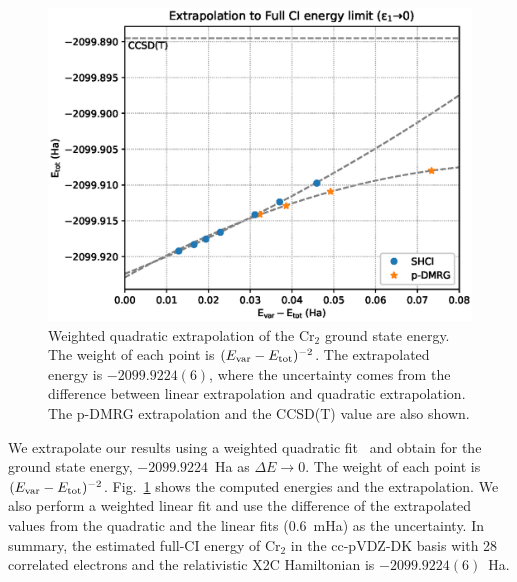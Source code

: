 \documentclass[%
reprint,
 superscriptaddress,
 amsmath,amssymb,
 aps,
]{revtex4-1}
\begin{document}
\begin{figure}
  \includegraphics[width=\linewidth]{extrapolation/extrapolate.eps}
  \caption{Weighted quadratic extrapolation of the Cr$_2$ ground state energy.
  The weight of each point is $(E_{\rm var} - E_{\rm tot})^{-2}$.
  The extrapolated energy is $-2099.9224(6)$, where the uncertainty comes from the difference between linear extrapolation and quadratic extrapolation.
  The p-DMRG extrapolation and the CCSD(T) value are also shown.
}
  \label{fig:extrapolation}
\end{figure}

We extrapolate our results using a weighted quadratic fit~\cite{ChiHolOttUmrShaZim-JPCA-18}
and obtain for the ground state energy, $-2099.9224$~Ha as $\Delta E\to0$.
The weight of each point is $(E_{\rm var} - E_{\rm tot})^{-2}$.
Fig.~\ref{fig:extrapolation} shows the computed energies and the extrapolation.
We also perform a weighted linear fit and use the difference of the extrapolated values from the quadratic and the linear fits (0.6~mHa) as the uncertainty.
In summary, the estimated full-CI energy of Cr$_2$ in the cc-pVDZ-DK basis with 28 correlated electrons and the relativistic X2C Hamiltonian
is $-2099.9224(6)$~Ha.
\end{document}
